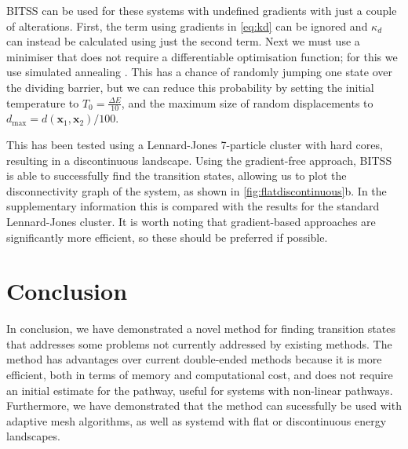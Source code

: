\documentclass[aps,twocolumn]{revtex4-1}
\begin{document}
\topic BITSS can be used for these systems with undefined gradients with just a couple of alterations.
First, the term using gradients in \cref{eq:kd} can be ignored and $\kappa_d$ can instead be calculated using just the second term.
Next we must use a minimiser that does not require a differentiable optimisation function; for this we use simulated annealing \cite{Kirkpatrick1983}.
This has a chance of randomly jumping one state over the dividing barrier, but we can reduce this probability by setting the initial temperature to $T_0 = \frac{\Delta E}{10}$, and the maximum size of random displacements to $d_\text{max} = d(\bm{x}_1, \bm{x}_2) / 100$.

\topic This has been tested using a Lennard-Jones 7-particle cluster with hard cores, resulting in a discontinuous landscape.
Using the gradient-free approach, BITSS is able to successfully find the transition states, allowing us to plot the disconnectivity graph of the system, as shown in \cref{fig:flatdiscontinuous}b.
In the supplementary information this is compared with the results for the standard Lennard-Jones cluster.
It is worth noting that gradient-based approaches are significantly more efficient, so these should be preferred if possible.


\section{Conclusion}
\topic In conclusion, we have demonstrated a novel method for finding transition states that addresses some problems not currently addressed by existing methods.
The method has advantages over current double-ended methods because it is more efficient, both in terms of memory and computational cost, and does not require an initial estimate for the pathway, useful for systems with non-linear pathways.
Furthermore, we have demonstrated that the method can sucessfully be used with adaptive mesh algorithms, as well as systemd with flat or discontinuous energy landscapes.




\end{document}
